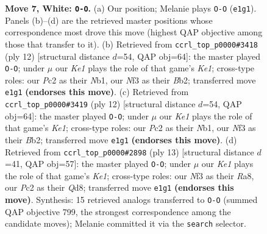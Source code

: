 \documentclass[11pt]{article}
\begin{document}
\begin{figure}[p]
\caption{\textbf{Move 7, White: \texttt{O-O}.} (a) Our position; Melanie plays \texttt{O-O} (\texttt{e1g1}). Panels (b)--(d) are the retrieved master positions whose correspondence most drove this move (highest QAP objective among those that transfer to it). (b) Retrieved from \texttt{ccrl\_top\_p0000\#3418} (ply 12) [structural distance $d$=54, QAP obj=64]: the master played \texttt{O-O}; under $\mu$ our \emph{Ke1} plays the role of that game's \emph{Ke1}; cross-type roles: our \emph{P}c2 as their \emph{N}b1, our \emph{N}f3 as their \emph{B}b2; transferred move \texttt{e1g1} \textbf{(endorses this move)}. (c) Retrieved from \texttt{ccrl\_top\_p0000\#3419} (ply 12) [structural distance $d$=54, QAP obj=64]: the master played \texttt{O-O}; under $\mu$ our \emph{Ke1} plays the role of that game's \emph{Ke1}; cross-type roles: our \emph{P}c2 as their \emph{N}b1, our \emph{N}f3 as their \emph{B}b2; transferred move \texttt{e1g1} \textbf{(endorses this move)}. (d) Retrieved from \texttt{ccrl\_top\_p0000\#2898} (ply 13) [structural distance $d$=41, QAP obj=57]: the master played \texttt{O-O}; under $\mu$ our \emph{Ke1} plays the role of that game's \emph{Ke1}; cross-type roles: our \emph{N}f3 as their \emph{R}a8, our \emph{P}c2 as their \emph{Q}d8; transferred move \texttt{e1g1} \textbf{(endorses this move)}. Synthesis: 15 retrieved analogs transferred to \texttt{O-O} (summed QAP objective 799, the strongest correspondence among the candidate moves); Melanie committed it via the \texttt{search} selector.}
\label{fig:thought-m12}
\end{figure}

\clearpage
\end{document}
